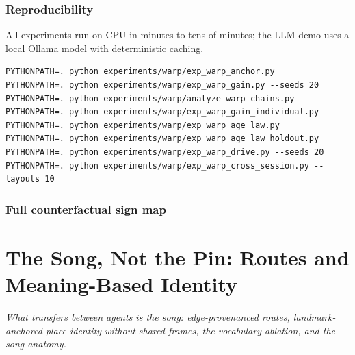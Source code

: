 \documentclass{article}
\begin{document}
\section{Reproducibility}
\label{p2:app:repro}
All experiments run on CPU in minutes-to-tens-of-minutes; the LLM demo
uses a local Ollama model with deterministic caching.
\begin{verbatim}
PYTHONPATH=. python experiments/warp/exp_warp_anchor.py
PYTHONPATH=. python experiments/warp/exp_warp_gain.py --seeds 20
PYTHONPATH=. python experiments/warp/analyze_warp_chains.py
PYTHONPATH=. python experiments/warp/exp_warp_gain_individual.py
PYTHONPATH=. python experiments/warp/exp_warp_age_law.py
PYTHONPATH=. python experiments/warp/exp_warp_age_law_holdout.py
PYTHONPATH=. python experiments/warp/exp_warp_drive.py --seeds 20
PYTHONPATH=. python experiments/warp/exp_warp_cross_session.py --layouts 10
\end{verbatim}

\section{Full counterfactual sign map}
\label{p2:app:signmap}
\FloatBarrier

\clearpage
\part{The Song, Not the Pin: Routes and Meaning-Based Identity}
\noindent\textit{What transfers between agents is the song: edge-provenanced routes, landmark-anchored place identity without shared frames, the vocabulary ablation, and the song anatomy.}
\end{document}
